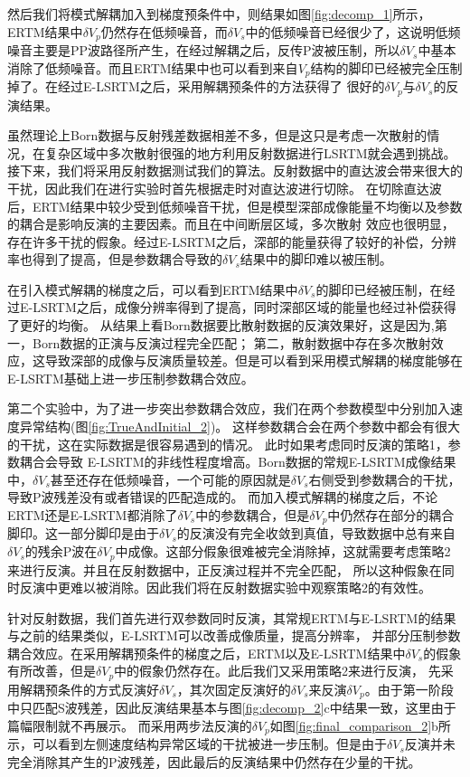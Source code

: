 然后我们将模式解耦加入到梯度预条件中，则结果如图\ref{fig:decomp_1}所示，ERTM结果中$\delta
V_p$仍然存在低频噪音，而$\delta
V_s$中的低频噪音已经很少了，这说明低频噪音主要是PP波路径所产生，在经过解耦之后，反传P波被压制，所以$\delta
V_s$中基本消除了低频噪音。而且ERTM结果中也可以看到来自$V_p$结构的脚印已经被完全压制掉了。在经过E-LSRTM之后，采用解耦预条件的方法获得了
很好的$\delta V_p$与$\delta V_s$的反演结果。

虽然理论上Born数据与反射残差数据相差不多，但是这只是考虑一次散射的情况，在复杂区域中多次散射很强的地方利用反射数据进行LSRTM就会遇到挑战。
接下来，我们将采用反射数据测试我们的算法。反射数据中的直达波会带来很大的干扰，因此我们在进行实验时首先根据走时对直达波进行切除。
在切除直达波后，ERTM结果中较少受到低频噪音干扰，但是模型深部成像能量不均衡以及参数的耦合是影响反演的主要因素。而且在中间断层区域，多次散射
效应也很明显，存在许多干扰的假象。经过E-LSRTM之后，深部的能量获得了较好的补偿，分辨率也得到了提高，但是参数耦合导致的$\delta
V_s$结果中的脚印难以被压制。

在引入模式解耦的梯度之后，可以看到ERTM结果中$\delta
V_s$的脚印已经被压制，在经过E-LSRTM之后，成像分辨率得到了提高，同时深部区域的能量也经过补偿获得了更好的均衡。
从结果上看Born数据要比散射数据的反演效果好，这是因为,第一，Born数据的正演与反演过程完全匹配；
第二，散射数据中存在多次散射效应，这导致深部的成像与反演质量较差。但是可以看到采用模式解耦的梯度能够在E-LSRTM基础上进一步压制参数耦合效应。

第二个实验中，为了进一步突出参数耦合效应，我们在两个参数模型中分别加入速度异常结构(图\ref{fig:TrueAndInitial_2})。
这样参数耦合会在两个参数中都会有很大的干扰，这在实际数据是很容易遇到的情况。
此时如果考虑同时反演的策略1，参数耦合会导致
E-LSRTM的非线性程度增高。Born数据的常规E-LSRTM成像结果中，$\delta
V_s$甚至还存在低频噪音，一个可能的原因就是$\delta V_s$右侧受到参数耦合的干扰，导致P波残差没有或者错误的匹配造成的。
而加入模式解耦的梯度之后，不论ERTM还是E-LSRTM都消除了$\delta
V_s$中的参数耦合，但是$\delta
V_p$中仍然存在部分的耦合脚印。这一部分脚印是由于$\delta
V_s$的反演没有完全收敛到真值，导致数据中总有来自$\delta V_s$的残余P波在$\delta
V_p$中成像。这部分假象很难被完全消除掉，这就需要考虑策略2来进行反演。并且在反射数据中，正反演过程并不完全匹配，
所以这种假象在同时反演中更难以被消除。因此我们将在反射数据实验中观察策略2的有效性。

针对反射数据，我们首先进行双参数同时反演，其常规ERTM与E-LSRTM的结果与之前的结果类似，E-LSRTM可以改善成像质量，提高分辨率，
并部分压制参数耦合效应。在采用解耦预条件的梯度之后，ERTM以及E-LSRTM结果中$\delta
V_s$的假象有所改善，但是$\delta
V_p$中的假象仍然存在。此后我们又采用策略2来进行反演，
先采用解耦预条件的方式反演好$\delta V_s$，其次固定反演好的$\delta V_s$来反演$\delta
V_p$。由于第一阶段中只匹配S波残差，因此反演结果基本与图\ref{fig:decomp_2}c中结果一致，这里由于篇幅限制就不再展示。
而采用两步法反演的$\delta
V_p$如图\ref{fig:final_comparison_2}b所示，可以看到左侧速度结构异常区域的干扰被进一步压制。但是由于$\delta
V_s$反演并未完全消除其产生的P波残差，因此最后的反演结果中仍然存在少量的干扰。


